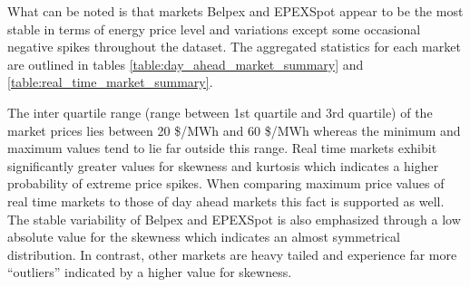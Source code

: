 What can be noted is that markets Belpex and EPEXSpot appear to be the most stable in terms of energy price level and variations except some occasional negative spikes throughout the dataset. The aggregated statistics for each market are outlined in tables \ref{table:day_ahead_market_summary} and \ref{table:real_time_market_summary}. 

The inter quartile range (range between 1st quartile and 3rd quartile) of the market prices lies between 20 \$/MWh and 60 \$/MWh whereas the minimum and maximum values tend to lie far outside this range. Real time markets exhibit significantly greater values for skewness and kurtosis which indicates a higher probability of extreme price spikes. When comparing maximum price values of real time markets to those of day ahead markets this fact is supported as well. 
The stable variability of Belpex and EPEXSpot is also emphasized through a low absolute value for the skewness which indicates an almost symmetrical distribution. In contrast, other markets are heavy tailed and experience far more "`outliers"' indicated by a higher value for skewness. 




%
%
%


